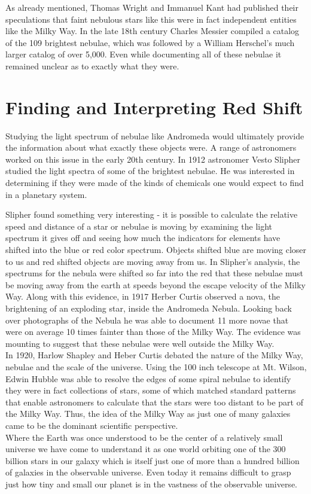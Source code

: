 \documentclass[18pt a4 paper]{article}
\begin{document}
As already mentioned, Thomas Wright and Immanuel Kant had published their speculations that faint nebulous stars like this were in fact independent entities like the Milky Way. In the late 18th century Charles Messier compiled a catalog of the 109 brightest nebulae, which was followed by a William Herschel's much larger catalog of over 5,000. Even while documenting all of these nebulae it remained unclear as to exactly what they were.
\section{Finding and Interpreting Red Shift}
Studying the light spectrum of nebulae like Andromeda would ultimately provide the information about what exactly these objects were. A range of astronomers worked on this issue in the early 20th century. In 1912 astronomer Vesto Slipher studied the light spectra of some of the brightest nebulae. He was interested in determining if they were made of the kinds of chemicals one would expect to find in a planetary system.

Slipher found something very interesting - it is possible to calculate the relative speed and distance of a star or nebulae is moving by examining the light spectrum it gives off and seeing how much the indicators for elements have shifted into the blue or red color spectrum. Objects shifted blue are moving closer to us and red shifted objects are moving away from us. In Slipher's analysis, the spectrums for the nebula were shifted so far into the red that these nebulae must be moving away from the earth at speeds beyond the escape velocity of the Milky Way. Along with this evidence, in 1917 Herber Curtis observed a nova, the brightening of an exploding star, inside the Andromeda Nebula. Looking back over photographs of the Nebula he was able to document 11 more novae that were on average 10 times fainter than those of the Milky Way. The evidence was mounting to suggest that these nebulae were well outside the Milky Way.\\

In 1920, Harlow Shapley and Heber Curtis debated the nature of the Milky Way, nebulae and the scale of the universe. Using the 100 inch telescope at Mt. Wilson, Edwin Hubble was able to resolve the edges of some spiral nebulae to identify they were in fact collections of stars, some of which matched standard patterns that enable astronomers to calculate that the stars were too distant to be part of the Milky Way.  Thus, the idea of the Milky Way as just one of many galaxies came to be the dominant scientific perspective.\\

Where the Earth was once understood to be the center of a relatively small universe we have come to understand it as one world orbiting one of the 300 billion stars in our galaxy which is itself just one of more than a hundred billion of galaxies in the observable universe. Even today it remains difficult to grasp just how tiny and small our planet is in the vastness of the observable universe.
\end{document}
